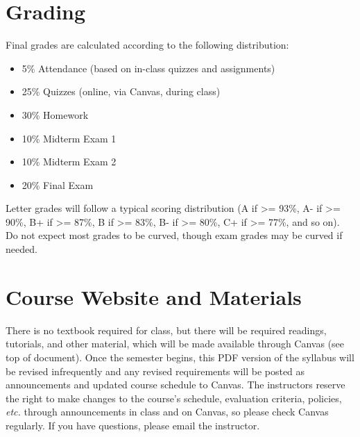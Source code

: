 \documentclass[10pt]{memoir}
\begin{document}
\section{\textbf{Grading}}

Final grades are calculated according to the following distribution:
\begin{itemize}
\item 5\% Attendance (based on in-class quizzes and assignments)
\item 25\% Quizzes (online, via Canvas, during class)
\item 30\% Homework
\item 10\% Midterm Exam 1
\item 10\% Midterm Exam 2
\item 20\% Final Exam
\end{itemize}

Letter grades will follow a typical scoring distribution (A if >= 93\%, A- if >= 90\%, B+ if >=
87\%, B if >= 83\%, B- if >= 80\%, C+ if >= 77\%, and so on). Do not expect most grades to be
curved, though exam grades may be curved if needed.


\section{\textbf{Course Website and Materials}}
There is no textbook required for class, but there will be required readings, tutorials, and other material, which will be made available through Canvas (see top of document). Once the semester begins, this PDF version of the syllabus will be revised infrequently and any revised requirements will be posted as announcements and updated course schedule to Canvas. The instructors reserve the right to make changes to the course's schedule, evaluation criteria, policies, \textit{etc.} through announcements in class and on Canvas, so please check Canvas regularly. If you have questions, please email the instructor.
\end{document}
